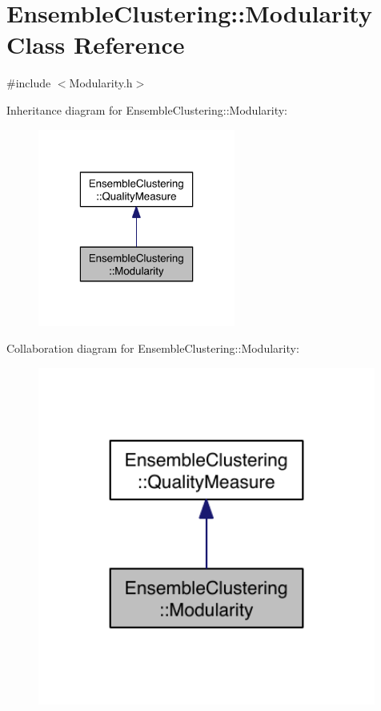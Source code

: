 \hypertarget{class_ensemble_clustering_1_1_modularity}{\section{Ensemble\-Clustering\-:\-:Modularity Class Reference}
\label{class_ensemble_clustering_1_1_modularity}
}


{\ttfamily \#include $<$Modularity.\-h$>$}



Inheritance diagram for Ensemble\-Clustering\-:\-:Modularity\-:\nopagebreak
\begin{figure}[H]
\begin{center}
\leavevmode
\includegraphics[width=184pt]{class_ensemble_clustering_1_1_modularity__inherit__graph}
\end{center}
\end{figure}


Collaboration diagram for Ensemble\-Clustering\-:\-:Modularity\-:\nopagebreak
\begin{figure}[H]
\begin{center}
\leavevmode
\includegraphics[width=315pt]{class_ensemble_clustering_1_1_modularity__coll__graph}
\end{center}
\end{figure}
